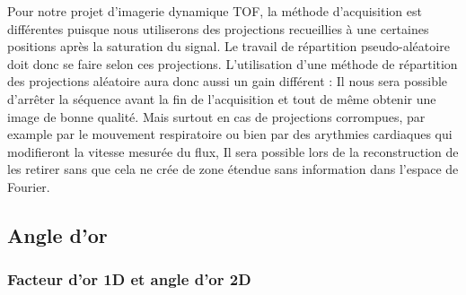 Pour notre projet d'imagerie dynamique TOF, la méthode d'acquisition est différentes puisque nous utiliserons des projections recueillies à une certaines positions après la saturation du signal. Le travail de répartition pseudo-aléatoire doit donc se faire selon ces projections. 
L'utilisation d'une méthode de répartition des projections aléatoire aura donc aussi un gain différent : Il nous sera possible d'arrêter la séquence avant la fin de l'acquisition et tout de même obtenir une image de bonne qualité. Mais surtout en cas de projections corrompues, par example par le mouvement respiratoire ou bien par des arythmies cardiaques qui modifieront la vitesse mesurée du flux, Il sera possible lors de la reconstruction de les retirer sans que cela ne crée de zone étendue sans information dans l'espace de Fourier.

\subsection{Angle d'or}

\subsubsection{Facteur d'or 1D et angle d'or 2D}

